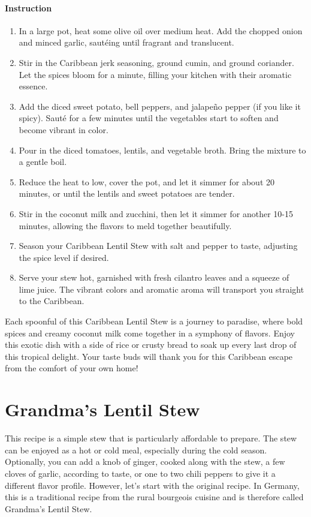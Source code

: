 \paragraph{Instruction} 
\begin{enumerate}[topsep=0pt,itemsep=-1ex,partopsep=1ex,parsep=1ex]
	\item In a large pot, heat some olive oil over medium heat. Add the chopped onion and minced garlic, sautéing until fragrant and translucent.
	\item Stir in the Caribbean jerk seasoning, ground cumin, and ground coriander. Let the spices bloom for a minute, filling your kitchen with their aromatic essence.
	\item Add the diced sweet potato, bell peppers, and jalapeño pepper (if you like it spicy). Sauté for a few minutes until the vegetables start to soften and become vibrant in color.
	\item Pour in the diced tomatoes, lentils, and vegetable broth. Bring the mixture to a gentle boil.
	\item Reduce the heat to low, cover the pot, and let it simmer for about 20 minutes, or until the lentils and sweet potatoes are tender.
	\item Stir in the coconut milk and zucchini, then let it simmer for another 10-15 minutes, allowing the flavors to meld together beautifully.
	\item Season your Caribbean Lentil Stew with salt and pepper to taste, adjusting the spice level if desired.
	\item Serve your stew hot, garnished with fresh cilantro leaves and a squeeze of lime juice. The vibrant colors and aromatic aroma will transport you straight to the Caribbean.
\end{enumerate}

Each spoonful of this Caribbean Lentil Stew is a journey to paradise, where bold spices and creamy coconut milk come together in a symphony of flavors. Enjoy this exotic dish with a side of rice or crusty bread to soak up every last drop of this tropical delight. Your taste buds will thank you for this Caribbean escape from the comfort of your own home!

\section{Grandma's Lentil Stew}
\label{grandmaslentilsstew}

This recipe is a simple stew that is particularly affordable to prepare. The stew can be enjoyed as a hot or cold meal, especially during the cold season. Optionally, you can add a knob of ginger, cooked along with the stew, a few cloves of garlic, according to taste, or one to two chili peppers to give it a different flavor profile. However, let's start with the original recipe. In Germany, this is a traditional recipe from the rural bourgeois cuisine and is therefore called Grandma's Lentil Stew.


